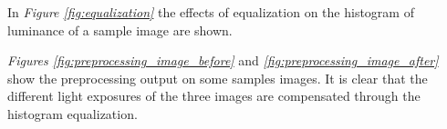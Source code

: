     \par{
        In \emph{Figure \ref{fig:equalization}} the effects of equalization on the histogram of luminance of a sample image are shown.
    }
    \par{
        \emph{Figures \ref{fig:preprocessing_image_before}} and \emph{\ref{fig:preprocessing_image_after}} show the preprocessing output on some samples images. It is clear that the different light exposures of the three images are compensated through the histogram equalization.
    }